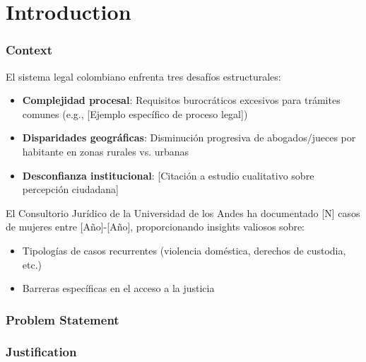 \chapter{Introduction}
\label{cha:introduction}



\subsection{Context} 
El sistema legal colombiano enfrenta tres desafíos estructurales:
\begin{itemize}
    \item \textbf{Complejidad procesal}: Requisitos burocráticos excesivos para trámites comunes (e.g., [Ejemplo específico de proceso legal])
    \item \textbf{Disparidades geográficas}: Disminución progresiva de abogados/jueces por habitante en zonas rurales vs. urbanas
    \item \textbf{Desconfianza institucional}: [Citación a estudio cualitativo sobre percepción ciudadana]
\end{itemize}

El Consultorio Jurídico de la Universidad de los Andes ha documentado [N] casos de mujeres entre [Año]-[Año], proporcionando insights valiosos sobre:
\begin{itemize}
    \item Tipologías de casos recurrentes (violencia doméstica, derechos de custodia, etc.)
    \item Barreras específicas en el acceso a la justicia
\end{itemize}
\subsection{Problem Statement} 
\subsection{Justification} 
